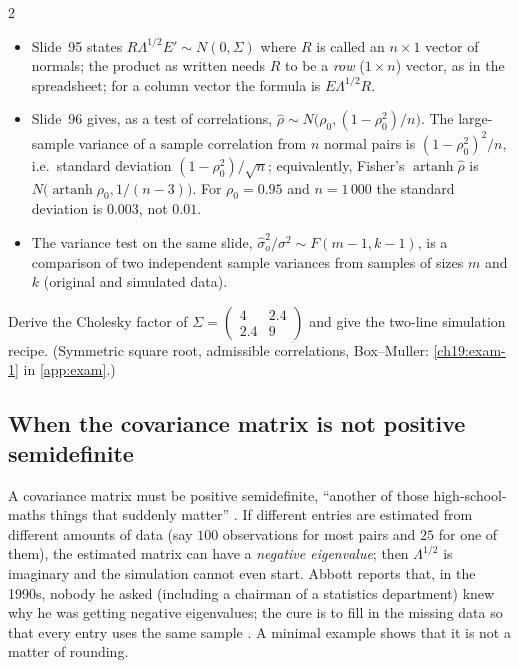 \begin{paracol}{2}
\begin{coursenote}\label{ch19:cn-slide95}
\begin{itemize}
  \item Slide~95 states $R\Lambda^{1/2}E'\sim N(0,\Sigma)$ where $R$ is called an $n\times1$ vector of normals; the product as written needs $R$ to be a \emph{row} ($1\times n$) vector, as in the spreadsheet; for a column vector the formula is $E\Lambda^{1/2}R$.
  \item Slide~96 gives, as a test of correlations, $\hat\rho\sim N\bigl(\rho_0,(1-\rho_0^2)/n\bigr)$. The large-sample variance of a sample correlation from $n$ normal pairs is $(1-\rho_0^2)^2/n$, i.e.\ standard deviation $(1-\rho_0^2)/\sqrt n$; equivalently, Fisher's $\operatorname{artanh}\hat\rho$ is $N\bigl(\operatorname{artanh}\rho_0,1/(n-3)\bigr)$. For $\rho_0=0.95$ and $n=1\,000$ the standard deviation is $0.003$, not $0.01$.
  \item The variance test on the same slide, $\hat\sigma_o^2/\sigma^2\sim F(m-1,k-1)$, is a comparison of two independent sample variances from samples of sizes $m$ and $k$ (original and simulated data).
\end{itemize}
\end{coursenote}

\begin{exercise}\label{ch19:exam-1-short}
Derive the Cholesky factor of $\Sigma=\begin{pmatrix}4&2.4\\2.4&9\end{pmatrix}$ and give the two-line simulation recipe. (Symmetric square root, admissible correlations, Box--Muller: \cref{ch19:exam-1} in \cref{app:exam}.)
\end{exercise}

\subsection{When the covariance matrix is not positive semidefinite}
A covariance matrix must be positive semidefinite, ``another of those high-school-maths things that suddenly matter'' . If different entries are estimated from different amounts of data (say $100$ observations for most pairs and $25$ for one of them), the estimated matrix can have a \emph{negative eigenvalue}; then $\Lambda^{1/2}$ is imaginary and the simulation cannot even start. Abbott reports that, in the 1990s, nobody he asked (including a chairman of a statistics department) knew why he was getting negative eigenvalues; the cure is to fill in the missing data so that every entry uses the same sample . A minimal example shows that it is not a matter of rounding.


\end{paracol}
